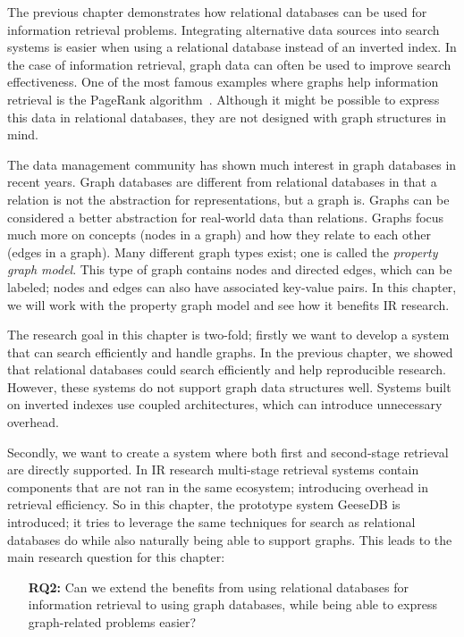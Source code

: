 The previous chapter demonstrates how relational databases can be used for information retrieval problems. Integrating alternative data sources into search systems is easier when using a relational database instead of an inverted index. In the case of information retrieval, graph data can often be used to improve search effectiveness. One of the most famous examples where graphs help information retrieval is the PageRank algorithm~\citep{pagerank}. Although it might be possible to express this data in relational databases, they are not designed with graph structures in mind. 

The data management community has shown much interest in graph databases in recent years. Graph databases are different from relational databases in that a relation is not the abstraction for representations, but a graph is. Graphs can be considered a better abstraction for real-world data than relations. Graphs focus much more on concepts (nodes in a graph) and how they relate to each other (edges in a graph). Many different graph types exist; one is called the \emph{property graph model}. This type of graph contains nodes and directed edges, which can be labeled; nodes and edges can also have associated key-value pairs. In this chapter, we will work with the property graph model and see how it benefits IR research.

The research goal in this chapter is two-fold; firstly we want to develop a system that can search efficiently and handle graphs. In the previous chapter, we showed that relational databases could search efficiently and help reproducible research. However, these systems do not support graph data structures well. Systems built on inverted indexes use coupled architectures, which can introduce unnecessary overhead.

Secondly, we want to create a system where both first and second-stage retrieval are directly supported. In IR research multi-stage retrieval systems contain components that are not ran in the same ecosystem; introducing overhead in retrieval efficiency. 
So in this chapter, the prototype system GeeseDB is introduced; it tries to leverage the same techniques for search as relational databases do while also naturally being able to support graphs. This leads to the main research question for this chapter:

\begin{itemize}
	\item[\textbf{RQ2:}] Can we extend the benefits from using relational databases for information retrieval to using graph databases, while being able to express graph-related problems easier?
\end{itemize} 

